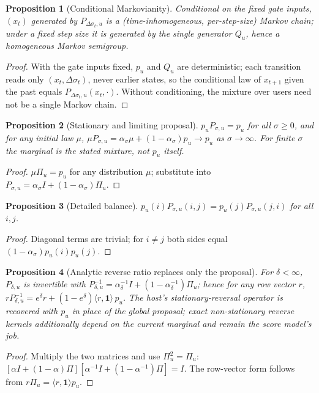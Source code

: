 \documentclass[letterpaper]{article}
\newcommand{\pu}{p_{u}}
\newtheorem{proposition}{Proposition}
\begin{document}
\begin{proposition}[Conditional Markovianity]
\label{prop:markov-app}
Conditional on the fixed gate inputs, $(x_t)$ generated by
$P_{\Delta\sigma_t,u}$ is a (time-inhomogeneous, per-step-size) Markov
chain; under a fixed step size it is generated by the single generator
$Q_u$, hence a homogeneous Markov semigroup.
\end{proposition}
\begin{proof}
With the gate inputs fixed, $\pu$ and $Q_u$ are deterministic; each
transition reads only $(x_t,\Delta\sigma_t)$, never earlier states, so
the conditional law of $x_{t+1}$ given the past equals
$P_{\Delta\sigma_t,u}(x_t,\cdot)$. Without conditioning, the mixture
over users need not be a single Markov chain.
\end{proof}

\begin{proposition}[Stationary and limiting proposal]
\label{prop:stationary-app}
$\pu P_{\sigma,u}=\pu$ for all $\sigma\ge0$, and for any initial law
$\mu$, $\mu P_{\sigma,u}=\alpha_\sigma\mu+(1-\alpha_\sigma)\pu\to\pu$
as $\sigma\to\infty$. For finite $\sigma$ the marginal is the stated
mixture, not $\pu$ itself.
\end{proposition}
\begin{proof}
$\mu\Pi_u=\pu$ for any distribution $\mu$; substitute into
$P_{\sigma,u}=\alpha_\sigma I+(1-\alpha_\sigma)\Pi_u$.
\end{proof}

\begin{proposition}[Detailed balance]
\label{prop:balance-app}
$\pu(i)P_{\sigma,u}(i,j)=\pu(j)P_{\sigma,u}(j,i)$ for all $i,j$.
\end{proposition}
\begin{proof}
Diagonal terms are trivial; for $i\ne j$ both sides equal
$(1-\alpha_\sigma)\pu(i)\pu(j)$.
\end{proof}

\begin{proposition}[Analytic reverse ratio replaces only the proposal]
\label{prop:reverse-app}
For $\delta<\infty$, $P_{\delta,u}$ is invertible with
$P_{\delta,u}^{-1}=\alpha_\delta^{-1}I+(1-\alpha_\delta^{-1})\Pi_u$;
hence for any row vector $r$,
$rP_{\delta,u}^{-1}=e^{\delta}r+(1-e^{\delta})\langle
r,\mathbf{1}\rangle\,\pu$. The host's stationary-reversal operator is
recovered with $\pu$ in place of the global proposal; exact
non-stationary reverse kernels additionally depend on the current
marginal and remain the score model's job.
\end{proposition}
\begin{proof}
Multiply the two matrices and use $\Pi_u^2=\Pi_u$:
$[\alpha I+(1-\alpha)\Pi][\alpha^{-1}I+(1-\alpha^{-1})\Pi]=I$. The
row-vector form follows from $r\Pi_u=\langle r,\mathbf{1}\rangle\pu$.
\end{proof}
\end{document}
